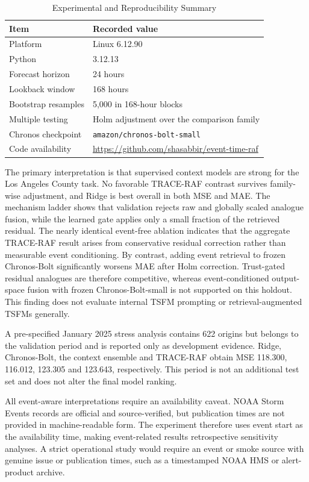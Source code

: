 \documentclass{ieeeaccess}
\begin{document}
\begin{table}[!t]
\centering
\caption{Experimental and Reproducibility Summary}
\label{tab:compute_summary}
\begin{tabular}{ll}
\toprule
Item & Recorded value \\
\midrule
Platform & Linux 6.12.90 \\
Python & 3.12.13 \\
Forecast horizon & 24 hours \\
Lookback window & 168 hours \\
Bootstrap resamples & 5,000 in 168-hour blocks \\
Multiple testing & Holm adjustment over the comparison family \\
Chronos checkpoint & \texttt{amazon/chronos-bolt-small} \\
Code availability & \url{https://github.com/shasabbir/event-time-raf} \\
\bottomrule
\end{tabular}
\end{table}

The primary interpretation is that supervised context models are strong for the Los Angeles County task. No favorable TRACE-RAF contrast survives family-wise adjustment, and Ridge is best overall in both MSE and MAE. The mechanism ladder shows that validation rejects raw and globally scaled analogue fusion, while the learned gate applies only a small fraction of the retrieved residual. The nearly identical event-free ablation indicates that the aggregate TRACE-RAF result arises from conservative residual correction rather than measurable event conditioning. By contrast, adding event retrieval to frozen Chronos-Bolt significantly worsens MAE after Holm correction. Trust-gated residual analogues are therefore competitive, whereas event-conditioned output-space fusion with frozen Chronos-Bolt-small is not supported on this holdout. This finding does not evaluate internal TSFM prompting or retrieval-augmented TSFMs generally.

A pre-specified January 2025 stress analysis contains 622 origins but belongs to the validation period and is reported only as development evidence. Ridge, Chronos-Bolt, the context ensemble and TRACE-RAF obtain MSE 118.300, 116.012, 123.305 and 123.643, respectively. This period is not an additional test set and does not alter the final model ranking.

All event-aware interpretations require an availability caveat. NOAA Storm Events records are official and source-verified, but publication times are not provided in machine-readable form. The experiment therefore uses event start as the availability time, making event-related results retrospective sensitivity analyses. A strict operational study would require an event or smoke source with genuine issue or publication times, such as a timestamped NOAA HMS or alert-product archive.
\end{document}
